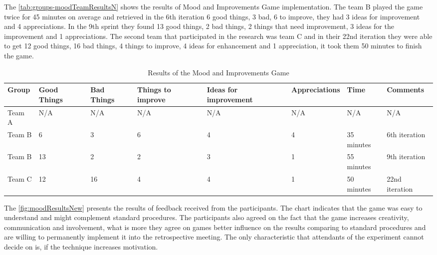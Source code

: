 The \autoref{tab:groups-moodTeamResultsN} shows the results of Mood and Improvements Game implementation. The team B played the game twice for 45 minutes on average and retrieved in the 6th iteration 6 good things, 3 bad, 6 to improve, they had 3 ideas for improvement and 4 appreciations. In the 9th sprint they found 13 good things, 2 bad things, 2 things that need improvement, 3 ideas for the improvement and 1 appreciations. The second team that participated in the research was team C and in their 22nd iteration they were able to get 12 good things, 16 bad things, 4 things to improve, 4 ideas for enhancement and 1 appreciation, it took them 50 minutes to finish the game.

\begin{table}[!htbp]
	\caption{Results of the Mood and Improvements Game}
	\label{tab:groups-moodTeamResultsN}
	\begin{tabularx}{\textwidth}{|X|X|X|X|X|X|X|X|}
	\hline
		Group & Good Things & Bad Things & Things to improve & Ideas for improvement & Appreciations & Time & Comments\\ \hline
		Team A & N/A & N/A & N/A & N/A & N/A & N/A & N/A \\ \hline
		Team B & 6 & 3 & 6 & 4 & 4 & 35 minutes & 6th iteration \\ \hline
		Team B & 13 & 2 & 2 & 3 & 1 & 55 minutes & 9th iteration \\ \hline
		Team C & 12 & 16 & 4 & 4 & 1 & 50 minutes & 22nd iteration\\ \hline
	\end{tabularx}
\end{table}

The \autoref{fig:moodResultsNew} presents the results of feedback received from the participants. The chart indicates that the game was easy to understand and might complement standard procedures. The participants also agreed on the fact that the game increases creativity, communication and involvement, what is more they agree on games better influence on the results comparing to standard procedures and are willing to permanently implement it into the retrospective meeting. The only characteristic that attendants of the experiment cannot decide on is, if the technique increases motivation.

